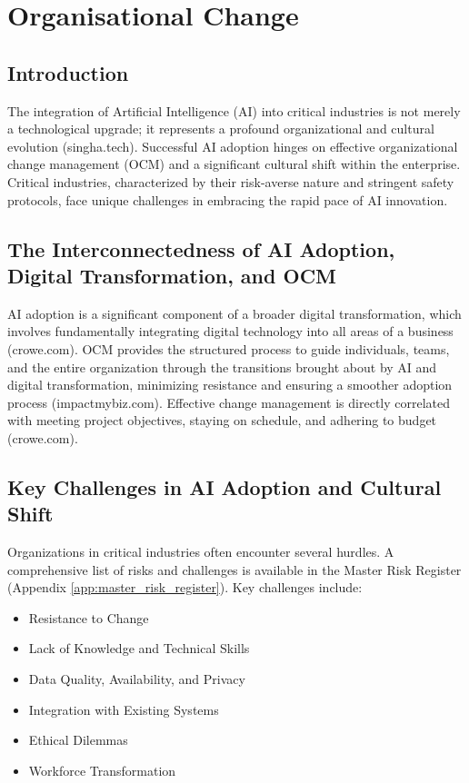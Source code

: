 \chapter{Organisational Change}
\section{Introduction}
The integration of Artificial Intelligence (AI) into critical industries is not merely a technological upgrade; it represents a profound organizational and cultural evolution (singha.tech). Successful AI adoption hinges on effective organizational change management (OCM) and a significant cultural shift within the enterprise. Critical industries, characterized by their risk-averse nature and stringent safety protocols, face unique challenges in embracing the rapid pace of AI innovation.

\section{The Interconnectedness of AI Adoption, Digital Transformation, and OCM}
AI adoption is a significant component of a broader digital transformation, which involves fundamentally integrating digital technology into all areas of a business (crowe.com). OCM provides the structured process to guide individuals, teams, and the entire organization through the transitions brought about by AI and digital transformation, minimizing resistance and ensuring a smoother adoption process (impactmybiz.com). Effective change management is directly correlated with meeting project objectives, staying on schedule, and adhering to budget (crowe.com).

\section{Key Challenges in AI Adoption and Cultural Shift}

Organizations in critical industries often encounter several hurdles. A comprehensive list of risks and challenges is available in the Master Risk Register (Appendix \ref{app:master_risk_register}). Key challenges include:

\begin{itemize}
    \item Resistance to Change
    \item Lack of Knowledge and Technical Skills
    \item Data Quality, Availability, and Privacy
    \item Integration with Existing Systems
    \item Ethical Dilemmas
    \item Workforce Transformation
\end{itemize}



